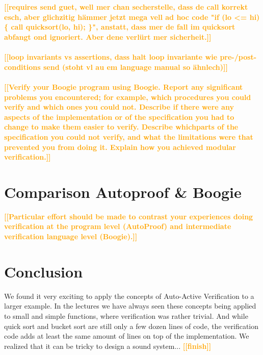 \documentclass{report}
\newcommand{\todo}[1]{\textsf{\textbf{\textcolor{orange}{[[#1]]}}}}
\begin{document}
\\\\
\todo{requires send guet, well mer chan secherstelle, dass de call korrekt esch, aber glichzitig hämmer jetzt mega vell ad hoc code "if (lo <= hi) \{ call quicksort(lo, hi); \}", anstatt, dass mer de fall im quicksort abfangt ond ignoriert. Aber dene verlürt mer sicherheit.}
\\\\
\todo{loop invariants vs assertions, dass halt loop invariante wie pre-/post-conditions send (stoht vl au em language manual so ähnlech)}
\\\\
\todo{Verify your Boogie program using Boogie. Report any
significant problems you encountered; for example, which procedures you could verify
and which ones you could not. Describe if there were any aspects of the implementation
or of the specification you had to change to make them easier to verify. Describe whichparts of the specification you could not verify, and what the limitations were that
prevented you from doing it. Explain how you achieved modular verification.}

\section{Comparison Autoproof \& Boogie}
\label{s:comparison}
\todo{Particular effort should be made to contrast your experiences doing verification at the
program level (AutoProof) and intermediate verification language level (Boogie).}

\section{Conclusion}
\label{s:conclusion}
We found it very exciting to apply the concepts of Auto-Active Verification to a larger example. In the lectures we have always seen these concepts being applied to small and simple functions, where verification was rather trivial. And while quick sort and bucket sort are still only a few dozen lines of code, the verification code adds at least the same amount of lines on top of the implementation.
We realized that it can be tricky to design a sound system...
\todo{finish}





\end{document}
